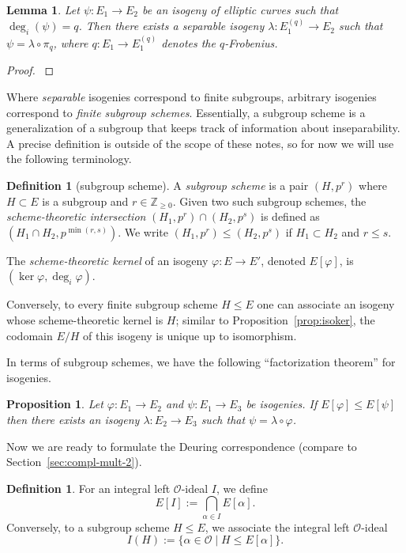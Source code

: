 \documentclass[10pt]{article}
\theoremstyle{plain}
\newtheorem{lemma}[theorem]{Lemma}
\newtheorem{proposition}[theorem]{Proposition}
\theoremstyle{definition}
\newtheorem{definition}[theorem]{Definition}
\def\Z{\ensuremath{\mathbb{Z}}}
\def\O{\ensuremath{\mathcal{O}}}
\begin{document}
\begin{prposition}
\begin{lemma}\label{lem:insepdecomp}
    Let $\psi:E_1\to E_2$ be an isogeny of elliptic curves such that
    $\deg_i(\psi)=q$. Then there exists a separable isogeny
    $\lambda:E_1^{(q)}\to E_2$ such that $\psi = \lambda\circ\pi_q$,
    where $q:E_1 \to E_1^{(q)}$ denotes the $q$-Frobenius.
\end{lemma}
\begin{proof}
    \cite[II, Coro.~2.12]{silverman:elliptic}
\end{proof}

Where \emph{separable} isogenies correspond to finite subgroups,
arbitrary isogenies correspond to \emph{finite subgroup schemes}.
Essentially, a subgroup scheme is a generalization of a subgroup that
keeps track of information about inseparability.
A precise definition is outside of the scope of these notes, so for
now we will use the following terminology.

\begin{definition}[subgroup scheme]
A \emph{subgroup scheme} is a pair $(H,p^r)$
where $H\subset E$ is a subgroup and $r\in\Z_{\geq 0}$.
Given two such subgroup schemes, the \emph{scheme-theoretic intersection}
$(H_1,p^r)\cap (H_2,p^s)$ is defined as $(H_1\cap H_2, p^{\min(r,s)})$.
We write $(H_1,p^r)\leq (H_2,p^s)$ if $H_1\subset H_2$ and $r\leq s$.

The \emph{scheme-theoretic kernel} of an isogeny $\varphi: E\to E'$,
denoted $E[\varphi]$, is $(\ker\varphi,\deg_i\varphi)$.
\end{definition}

Conversely, to every finite subgroup scheme $H\leq E$
one can associate an isogeny whose scheme-theoretic kernel is $H$;
similar to Proposition~\ref{prop:isoker}, the codomain $E/H$
of this isogeny is unique up to isomorphism.

In terms of subgroup schemes, we have the following ``factorization theorem''
for isogenies.

\begin{proposition}
Let $\varphi:E_1\to E_2$ and $\psi:E_1\to E_3$ be isogenies.
If $E[\varphi]\leq E[\psi]$ then there exists an isogeny
$\lambda:E_2\to E_3$ such that $\psi = \lambda\circ\varphi$.
\end{proposition}

Now we are ready to formulate the Deuring correspondence (compare to
Section~\ref{sec:compl-mult-2}).

\begin{definition}
For an integral left $\O$-ideal $I$, we define
\begin{equation*}
    E[I] := \bigcap_{\alpha\in I} E[\alpha].
\end{equation*}
Conversely, to a subgroup scheme $H\leq E$,
we associate the integral left $\O$-ideal 
\begin{equation*}
    I(H) := \{\alpha\in\O\mid H\leq E[\alpha]\}.
\end{equation*}
\end{definition}


\end{prposition}
\end{document}
